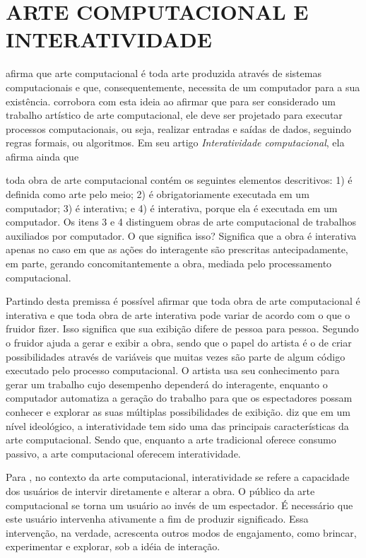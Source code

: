 \chapter{ARTE COMPUTACIONAL E INTERATIVIDADE}

 afirma que arte computacional é toda arte produzida através de sistemas  computacionais e que, consequentemente, necessita de um computador para a sua existência.  corrobora com esta ideia ao afirmar que para ser considerado um trabalho artístico de arte computacional, ele deve ser projetado para executar processos computacionais, ou seja, realizar entradas e saídas de dados, seguindo regras formais, ou algoritmos. Em seu artigo \textit{Interatividade computacional}, ela afirma ainda que

\begin{citacao}
toda obra de arte computacional contém os seguintes elementos descritivos: 1) é definida como arte pelo meio; 2) é obrigatoriamente executada em um computador; 3) é interativa; e 4) é interativa, porque ela é executada em um computador. Os itens 3 e 4 distinguem obras de arte computacional de trabalhos auxiliados por computador. O que significa isso? Significa que a obra é interativa apenas no caso em que as ações do interagente são prescritas antecipadamente, em parte, gerando concomitantemente a obra, mediada pelo processamento computacional.  \cite[p. 133]{venturelli}
\end{citacao}

Partindo desta premissa é possível afirmar que toda obra de arte computacional é interativa e que toda obra de arte interativa pode variar de acordo com o que o fruidor fizer. Isso significa que sua exibição difere de pessoa para pessoa. Segundo  o fruidor ajuda a gerar e exibir a obra, sendo que o papel do artista é o de criar possibilidades através de variáveis que muitas vezes são parte de algum código executado pelo processo computacional. O artista usa seu conhecimento para gerar um trabalho cujo desempenho dependerá do interagente, enquanto o computador automatiza a geração do trabalho para que os espectadores possam conhecer e explorar as suas múltiplas possibilidades de exibição.  diz que em um nível ideológico, a interatividade tem sido uma das principais características da arte computacional. Sendo que, enquanto a arte tradicional oferece consumo passivo, a arte computacional oferecem interatividade.

Para , no contexto da arte computacional, interatividade se refere a capacidade dos usuários de intervir diretamente e alterar a obra. O público da arte computacional se torna um usuário ao invés de um espectador. É necessário que este usuário intervenha ativamente a fim de produzir significado. Essa intervenção, na verdade, acrescenta outros modos de engajamento, como brincar, experimentar e explorar, sob a idéia de interação. 


